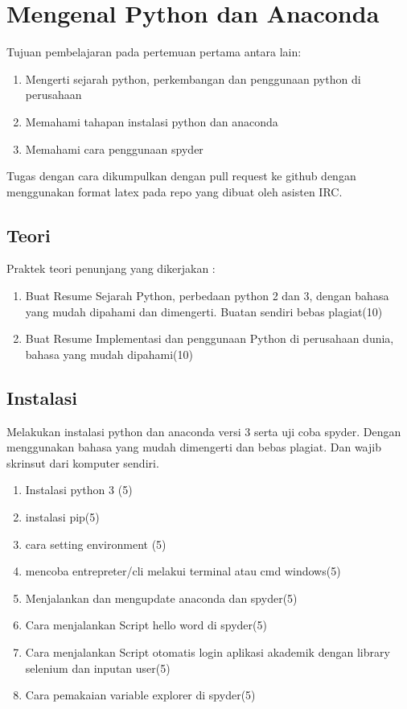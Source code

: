 \chapter{Mengenal Python dan Anaconda}
Tujuan pembelajaran pada pertemuan pertama antara lain:
\begin{enumerate}
\item
Mengerti sejarah python, perkembangan dan penggunaan python di perusahaan
\item
Memahami tahapan instalasi python dan anaconda
\item
Memahami cara penggunaan spyder
\end{enumerate}
Tugas dengan cara dikumpulkan dengan pull request ke github dengan menggunakan format latex pada repo yang dibuat oleh asisten IRC.

\section{Teori}
Praktek teori penunjang yang dikerjakan :
\begin{enumerate}
\item
Buat Resume Sejarah Python, perbedaan python 2 dan 3, dengan bahasa yang mudah dipahami dan dimengerti. Buatan sendiri bebas plagiat(10)
\item
Buat Resume Implementasi dan penggunaan Python di perusahaan dunia, bahasa yang mudah dipahami(10)
\end{enumerate}

\section{Instalasi}
Melakukan instalasi python dan anaconda versi 3 serta uji coba spyder. Dengan menggunakan bahasa yang mudah dimengerti dan bebas plagiat. 
Dan wajib skrinsut dari komputer sendiri.
\begin{enumerate}
\item
Instalasi python 3 (5)
\item
instalasi pip(5)
\item
cara setting environment (5)
\item
mencoba entrepreter/cli melakui terminal atau cmd windows(5)
\item 
Menjalankan dan mengupdate anaconda dan spyder(5)
\item
Cara menjalankan Script hello word di spyder(5)
\item
Cara menjalankan Script otomatis login aplikasi akademik dengan library selenium dan inputan user(5)
\item
Cara pemakaian variable explorer di spyder(5)
\end{enumerate}


